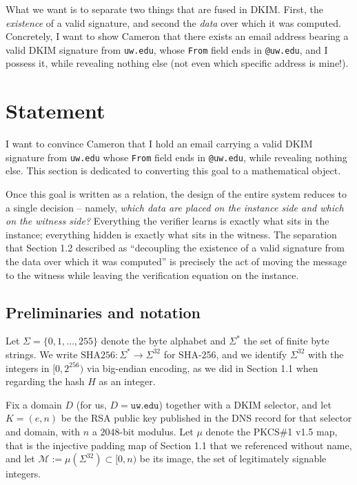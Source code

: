 \documentclass[12pt,reqno]{amsart}
\theoremstyle{definition}
\newcommand{\cM}{\mathcal{M}}
\newcommand{\sha}{\mathrm{SHA256}}
\begin{document}
What we want is to separate two things that are fused in DKIM. First, the \textit{existence} of a valid signature, and second the \textit{data} over which it was computed. Concretely, I want to show Cameron that there exists an email address bearing a valid DKIM signature from \verb|uw.edu|, whose \verb|From| field ends in \verb|@uw.edu|, and I possess it, while revealing nothing else (not even which specific address is mine!).


\section{Statement}

 
I want to convince Cameron that I hold an email carrying a valid DKIM signature from \texttt{uw.edu} whose \texttt{From} field ends in \texttt{@uw.edu}, while revealing nothing else. This section is dedicated to converting this goal to a mathematical object.
 
Once this goal is written as a relation, the design of the entire system reduces to a single decision -- namely, \emph{which data are placed on the instance side and which on the witness side?} Everything the verifier learns is exactly what sits in the instance; everything hidden is exactly what sits in the witness. The separation that Section 1.2 described as ``decoupling the existence of a valid signature from the data over
which it was computed'' is precisely the act of moving the message to the witness while leaving the verification equation on the instance.
 
\subsection{Preliminaries and notation}
 
Let $\Sigma = \{0,1,\dots,255\}$ denote the byte alphabet and $\Sigma^{*}$ the
set of finite byte strings. We write $\sha : \Sigma^{*} \to \Sigma^{32}$ for
SHA-256, and we identify $\Sigma^{32}$ with the integers in
$[0, 2^{256})$ via big-endian encoding, as we did in Section 1.1 when regarding
the hash $H$ as an integer.
 
Fix a domain $D$ (for us, $D = \texttt{uw.edu}$) together with a DKIM selector, and let $K=(e, n)$ be the RSA public key published in the DNS record for that selector and domain, with $n$ a $2048$-bit modulus. Let $\mu$ denote the PKCS\#1 v1.5 map, that is the injective padding map of Section 1.1 that we referenced without name, and let $\cM :=\mu(\Sigma^{32}) \subset [0,n)$ be its image, the set of legitimately signable integers.
 
\end{document}
